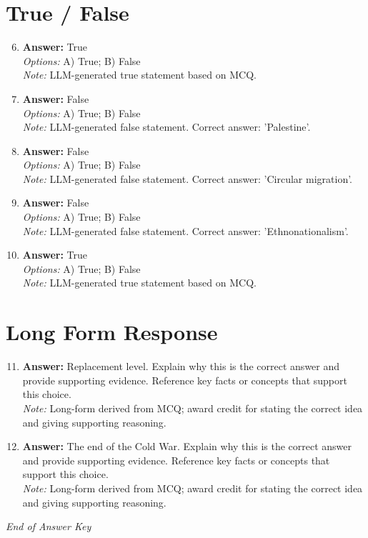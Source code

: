 \documentclass[12pt]{article}
\begin{document}
\section*{True / False}
\begin{enumerate}[label=\arabic*.]
\setcounter{enumi}{5}
\item \textbf{Answer:} True
\\ \textit{Options:} A) True; B) False
\\ \textit{Note:} LLM-generated true statement based on MCQ.
\item \textbf{Answer:} False
\\ \textit{Options:} A) True; B) False
\\ \textit{Note:} LLM-generated false statement. Correct answer: 'Palestine'.
\item \textbf{Answer:} False
\\ \textit{Options:} A) True; B) False
\\ \textit{Note:} LLM-generated false statement. Correct answer: 'Circular migration'.
\item \textbf{Answer:} False
\\ \textit{Options:} A) True; B) False
\\ \textit{Note:} LLM-generated false statement. Correct answer: 'Ethnonationalism'.
\item \textbf{Answer:} True
\\ \textit{Options:} A) True; B) False
\\ \textit{Note:} LLM-generated true statement based on MCQ.
\end{enumerate}

\section*{Long Form Response}
\begin{enumerate}[label=\arabic*.]
\setcounter{enumi}{10}
\item \textbf{Answer:} Replacement level. Explain why this is the correct answer and provide supporting evidence. Reference key facts or concepts that support this choice.
\\ \textit{Note:} Long-form derived from MCQ; award credit for stating the correct idea and giving supporting reasoning.
\item \textbf{Answer:} The end of the Cold War. Explain why this is the correct answer and provide supporting evidence. Reference key facts or concepts that support this choice.
\\ \textit{Note:} Long-form derived from MCQ; award credit for stating the correct idea and giving supporting reasoning.
\end{enumerate}

\vfill
\noindent\textit{End of Answer Key}
\end{document}
